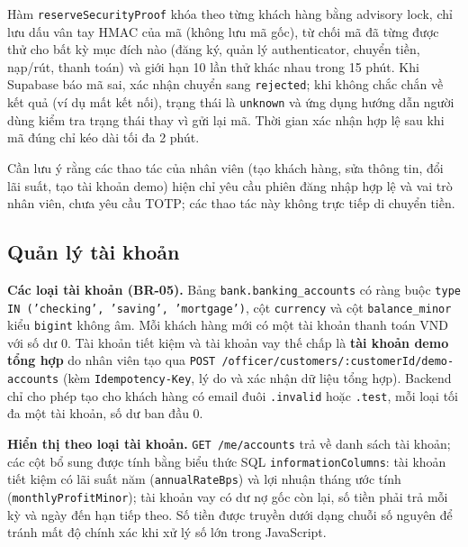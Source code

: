 Hàm \texttt{reserve\allowbreak{}Security\allowbreak{}Proof} khóa theo từng khách hàng bằng advisory lock, chỉ lưu dấu vân tay HMAC của mã (không lưu mã gốc), từ chối mã đã từng được thử cho bất kỳ mục đích nào (đăng ký, quản lý authenticator, chuyển tiền, nạp/rút, thanh toán) và giới hạn 10 lần thử khác nhau trong 15 phút. Khi Supabase báo mã sai, xác nhận chuyển sang \texttt{rejected}; khi không chắc chắn về kết quả (ví dụ mất kết nối), trạng thái là \texttt{unknown} và ứng dụng hướng dẫn người dùng kiểm tra trạng thái thay vì gửi lại mã. Thời gian xác nhận hợp lệ sau khi mã đúng chỉ kéo dài tối đa 2 phút.

Cần lưu ý rằng các thao tác của nhân viên (tạo khách hàng, sửa thông tin, đổi lãi suất, tạo tài khoản demo) hiện chỉ yêu cầu phiên đăng nhập hợp lệ và vai trò nhân viên, chưa yêu cầu TOTP; các thao tác này không trực tiếp di chuyển tiền.

\subsection{Quản lý tài khoản}
\label{sec:ch3-accounts}

\textbf{Các loại tài khoản (BR-05).} Bảng \texttt{bank.\allowbreak{}banking\_\allowbreak{}accounts} có ràng buộc \texttt{type IN ('checking', 'saving', 'mortgage')}, cột \texttt{currency} và cột \texttt{balance\_\allowbreak{}minor} kiểu \texttt{bigint} không âm. Mỗi khách hàng mới có một tài khoản thanh toán VND với số dư 0. Tài khoản tiết kiệm và tài khoản vay thế chấp là \textbf{tài khoản demo tổng hợp} do nhân viên tạo qua \texttt{POST /\allowbreak{}officer/\allowbreak{}customers/\allowbreak{}:customerId/\allowbreak{}demo-\allowbreak{}accounts} (kèm \texttt{Idempotency-\allowbreak{}Key}, lý do và xác nhận dữ liệu tổng hợp). Backend chỉ cho phép tạo cho khách hàng có email đuôi \texttt{.\allowbreak{}invalid} hoặc \texttt{.\allowbreak{}test}, mỗi loại tối đa một tài khoản, số dư ban đầu 0.

\textbf{Hiển thị theo loại tài khoản.} \texttt{GET /\allowbreak{}me/\allowbreak{}accounts} trả về danh sách tài khoản; các cột bổ sung được tính bằng biểu thức SQL \texttt{information\allowbreak{}Columns}: tài khoản tiết kiệm có lãi suất năm (\texttt{annualRateBps}) và lợi nhuận tháng ước tính (\texttt{monthly\allowbreak{}Profit\allowbreak{}Minor}); tài khoản vay có dư nợ gốc còn lại, số tiền phải trả mỗi kỳ và ngày đến hạn tiếp theo. Số tiền được truyền dưới dạng chuỗi số nguyên để tránh mất độ chính xác khi xử lý số lớn trong JavaScript.

